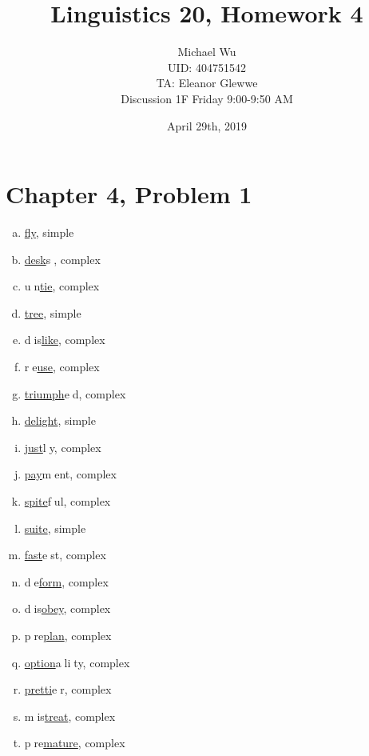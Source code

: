 \documentclass[12pt]{article}
\begin{document}
\title{Linguistics 20, Homework 4}
\date{April 29th, 2019}
\author{Michael Wu\\UID: 404751542\\TA: Eleanor Glewwe\\Discussion 1F Friday 9:00-9:50 AM}
\maketitle

\section*{Chapter 4, Problem 1}

\begin{multicols}{3}
    \begin{enumerate}[a)]
        \item \underline{fly}, simple
        \item \underline{desk}\textcircled{s}, complex
        \item \textcircled{un}\underline{tie}, complex
        \item \underline{tree}, simple
        \item \textcircled{dis}\underline{like}, complex
        \item \textcircled{re}\underline{use}, complex
        \item \underline{triumph}\textcircled{ed}, complex
        \item \underline{delight}, simple
        \item \underline{just}\textcircled{ly}, complex
        \item \underline{pay}\textcircled{ment}, complex
        \item \underline{spite}\textcircled{ful}, complex
        \item \underline{suite}, simple
        \item \underline{fast}\textcircled{est}, complex
        \item \textcircled{de}\underline{form}, complex
        \item \textcircled{dis}\underline{obey}, complex
        \item \textcircled{pre}\underline{plan}, complex
        \item \underline{option}\textcircled{al}\textcircled{ity}, complex
        \item \underline{pretti}\textcircled{er}, complex
        \item \textcircled{mis}\underline{treat}, complex
        \item \textcircled{pre}\underline{mature}, complex
    \end{enumerate}
\end{multicols}
\end{document}
